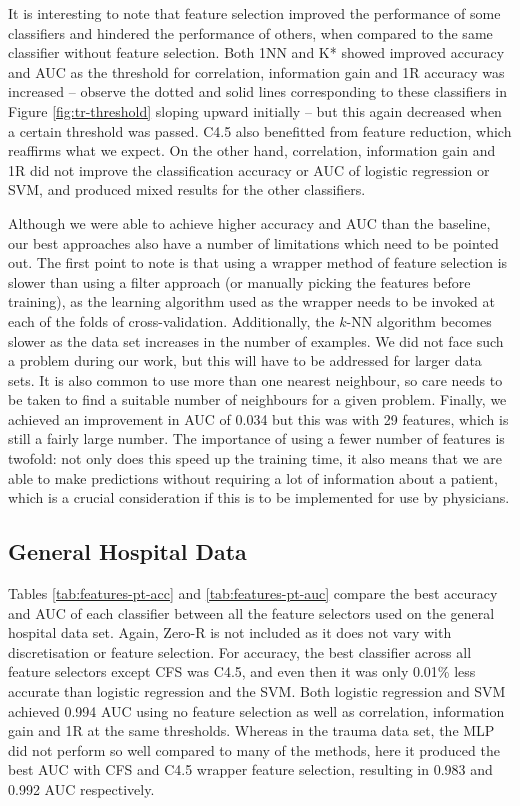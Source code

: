 It is interesting to note that feature selection improved the performance of
some classifiers and hindered the performance of others, when compared to the
same classifier without feature selection. Both 1NN and K* showed improved
accuracy and AUC as the threshold for correlation, information gain and 1R
accuracy was increased -- observe the dotted and solid lines corresponding
to these classifiers in Figure \ref{fig:tr-threshold} sloping upward initially
-- but this again decreased when a certain threshold was passed. C4.5 also
benefitted from feature reduction, which reaffirms what we expect. On the other
hand, correlation, information gain and 1R did not improve the classification
accuracy or AUC of logistic regression or SVM, and produced mixed results for
the other classifiers.

Although we were able to achieve higher accuracy and AUC than the baseline,
our best approaches also have a number of limitations which need to be pointed
out. The first point to note is that using a wrapper method of feature
selection is slower than using a filter approach (or manually picking the
features before training), as the learning algorithm used as the wrapper
needs to be invoked at each of the folds of cross-validation. Additionally,
the $k$-NN algorithm becomes slower as the data set increases in the number
of examples. We did not face such a problem during our work, but this will
have to be addressed for larger data sets. It is also common to use more
than one nearest neighbour, so care needs to be taken to find a suitable number
of neighbours for a given problem. Finally, we achieved an improvement
in AUC of 0.034 but this was with 29 features, which is still a fairly large
number. The importance of using a fewer number of features is twofold: not
only does this speed up the training time, it also means that we are able to
make predictions without requiring a lot of information about a patient,
which is a crucial consideration if this is to be implemented for use by
physicians.

\subsection{General Hospital Data}
Tables \ref{tab:features-pt-acc} and \ref{tab:features-pt-auc} compare the
best accuracy and AUC of each classifier between all the feature selectors
used on the general hospital data set. Again, Zero-R is not included as it
does not vary with discretisation or feature selection. For accuracy, the
best classifier across all feature selectors except CFS was C4.5, and even
then it
was only 0.01\% less accurate than logistic regression and the SVM. Both
logistic regression and SVM achieved 0.994 AUC using no feature selection
as well as correlation, information gain and 1R at the same thresholds. Whereas
in the trauma data set, the MLP did not perform so well compared to many of the
methods, here it produced the best AUC with CFS and C4.5 wrapper feature
selection, resulting in 0.983 and 0.992 AUC respectively.



